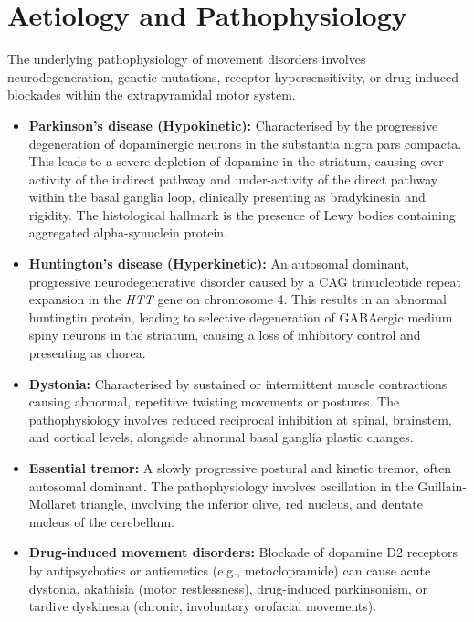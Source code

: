 \section*{Aetiology and Pathophysiology}
The underlying pathophysiology of movement disorders involves neurodegeneration, genetic mutations, receptor hypersensitivity, or drug-induced blockades within the extrapyramidal motor system.
\begin{itemize}
    \item \textbf{Parkinson's disease (Hypokinetic):} Characterised by the progressive degeneration of dopaminergic neurons in the substantia nigra pars compacta. This leads to a severe depletion of dopamine in the striatum, causing over-activity of the indirect pathway and under-activity of the direct pathway within the basal ganglia loop, clinically presenting as bradykinesia and rigidity. The histological hallmark is the presence of Lewy bodies containing aggregated alpha-synuclein protein.
    \item \textbf{Huntington's disease (Hyperkinetic):} An autosomal dominant, progressive neurodegenerative disorder caused by a CAG trinucleotide repeat expansion in the \textit{HTT} gene on chromosome 4. This results in an abnormal huntingtin protein, leading to selective degeneration of GABAergic medium spiny neurons in the striatum, causing a loss of inhibitory control and presenting as chorea.
    \item \textbf{Dystonia:} Characterised by sustained or intermittent muscle contractions causing abnormal, repetitive twisting movements or postures. The pathophysiology involves reduced reciprocal inhibition at spinal, brainstem, and cortical levels, alongside abnormal basal ganglia plastic changes.
    \item \textbf{Essential tremor:} A slowly progressive postural and kinetic tremor, often autosomal dominant. The pathophysiology involves oscillation in the Guillain-Mollaret triangle, involving the inferior olive, red nucleus, and dentate nucleus of the cerebellum.
    \item \textbf{Drug-induced movement disorders:} Blockade of dopamine D2 receptors by antipsychotics or antiemetics (e.g., metoclopramide) can cause acute dystonia, akathisia (motor restlessness), drug-induced parkinsonism, or tardive dyskinesia (chronic, involuntary orofacial movements).
\end{itemize}


